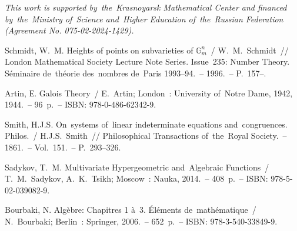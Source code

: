 \documentclass[twoside]{article}
\begin{document}
\medskip

\emph{This work is supported by~the~Krasnoyarsk Mathematical Center and financed
by~the~Ministry of~Science and~Higher Education of~the~Russian Federation (Agreement No. 075-02-2024-1429).}

\bigskip

\begin{thebibliography}{9}

 Schmidt, W.~M. Heights of points on subvarieties of $\mathbb{G}^n_m$~/ W.~M.~{Sch\-midt}~//
London Mathematical Society Lecture Note Series. Issue~235: Number Theory.
S\'eminaire de~th\'eorie des~nombres de~Paris 1993–94.~-- 1996.~-- P.~157--.

 Artin, Е. Galois Theory~/ E.~Artin; London~: University of~Notre Dame, 1942, 1944.~-- 96~p.~-- ISBN: 978-0-486-62342-9.

 Smith, H.J.S. On~systems of~linear indeterminate equations and~{con\-gru\-ences}. Philos.~/ H.J.S.~Smith~//
Philosophical Transactions of~the~Royal Society.~-- 1861.~-- Vol.~151.~-- P.~293--326.

 Sadykov, T.~M. Multivariate Hypergeometric and~Algebraic Functions~/ T.~M.~Sadykov, A.~K.~Tsikh;
Moscow~: Nauka, 2014.~-- 408~p.~-- ISBN: 978-5-02-039082-9.

 Bourbaki, N. Alg\`ebre: Chapitres 1 \`a~3. \'El\'ements de~math\'ematique~/ N.~Bourbaki; Berlin~: Springer, 2006.~-- 652~p.~-- ISBN: 978-3-540-33849-9.

\end{thebibliography}

\makeRusTit   %
\end{document}
